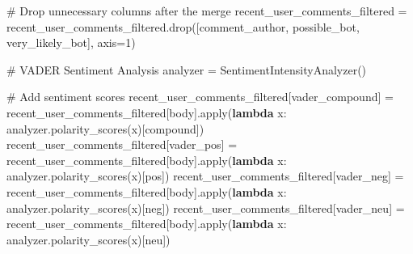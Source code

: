 \documentclass[
  12pt,
  letterpaper,
  DIV=11,
  numbers=noendperiod]{scrartcl}
\newenvironment{Shaded}{\begin{snugshade}}{\end{snugshade}}
\newcommand{\BuiltInTok}[1]{\textcolor[rgb]{0.00,0.23,0.31}{#1}}
\newcommand{\CommentTok}[1]{\textcolor[rgb]{0.37,0.37,0.37}{#1}}
\newcommand{\DecValTok}[1]{\textcolor[rgb]{0.68,0.00,0.00}{#1}}
\newcommand{\KeywordTok}[1]{\textcolor[rgb]{0.00,0.23,0.31}{\textbf{#1}}}
\newcommand{\NormalTok}[1]{\textcolor[rgb]{0.00,0.23,0.31}{#1}}
\newcommand{\OperatorTok}[1]{\textcolor[rgb]{0.37,0.37,0.37}{#1}}
\newcommand{\StringTok}[1]{\textcolor[rgb]{0.13,0.47,0.30}{#1}}
\begin{document}
\begin{Shaded}
\begin{Highlighting}[]
\CommentTok{\# Drop unnecessary columns after the merge}
\NormalTok{recent\_user\_comments\_filtered }\OperatorTok{=}\NormalTok{ recent\_user\_comments\_filtered.drop([}\StringTok{\textquotesingle{}comment\_author\textquotesingle{}}\NormalTok{, }\StringTok{\textquotesingle{}possible\_bot\textquotesingle{}}\NormalTok{, }\StringTok{\textquotesingle{}very\_likely\_bot\textquotesingle{}}\NormalTok{], axis}\OperatorTok{=}\DecValTok{1}\NormalTok{)}

\CommentTok{\# VADER Sentiment Analysis}
\NormalTok{analyzer }\OperatorTok{=}\NormalTok{ SentimentIntensityAnalyzer()}

\CommentTok{\# Add sentiment scores}
\NormalTok{recent\_user\_comments\_filtered[}\StringTok{\textquotesingle{}vader\_compound\textquotesingle{}}\NormalTok{] }\OperatorTok{=}\NormalTok{ recent\_user\_comments\_filtered[}\StringTok{\textquotesingle{}body\textquotesingle{}}\NormalTok{].}\BuiltInTok{apply}\NormalTok{(}\KeywordTok{lambda}\NormalTok{ x: analyzer.polarity\_scores(x)[}\StringTok{\textquotesingle{}compound\textquotesingle{}}\NormalTok{])}
\NormalTok{recent\_user\_comments\_filtered[}\StringTok{\textquotesingle{}vader\_pos\textquotesingle{}}\NormalTok{] }\OperatorTok{=}\NormalTok{ recent\_user\_comments\_filtered[}\StringTok{\textquotesingle{}body\textquotesingle{}}\NormalTok{].}\BuiltInTok{apply}\NormalTok{(}\KeywordTok{lambda}\NormalTok{ x: analyzer.polarity\_scores(x)[}\StringTok{\textquotesingle{}pos\textquotesingle{}}\NormalTok{])}
\NormalTok{recent\_user\_comments\_filtered[}\StringTok{\textquotesingle{}vader\_neg\textquotesingle{}}\NormalTok{] }\OperatorTok{=}\NormalTok{ recent\_user\_comments\_filtered[}\StringTok{\textquotesingle{}body\textquotesingle{}}\NormalTok{].}\BuiltInTok{apply}\NormalTok{(}\KeywordTok{lambda}\NormalTok{ x: analyzer.polarity\_scores(x)[}\StringTok{\textquotesingle{}neg\textquotesingle{}}\NormalTok{])}
\NormalTok{recent\_user\_comments\_filtered[}\StringTok{\textquotesingle{}vader\_neu\textquotesingle{}}\NormalTok{] }\OperatorTok{=}\NormalTok{ recent\_user\_comments\_filtered[}\StringTok{\textquotesingle{}body\textquotesingle{}}\NormalTok{].}\BuiltInTok{apply}\NormalTok{(}\KeywordTok{lambda}\NormalTok{ x: analyzer.polarity\_scores(x)[}\StringTok{\textquotesingle{}neu\textquotesingle{}}\NormalTok{])}


\end{Highlighting}
\end{Shaded}
\end{document}
